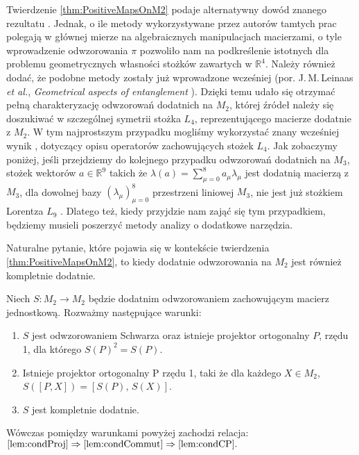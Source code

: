Twierdzenie \ref{thm:PositiveMapsOnM2} podaje alternatywny dowód
znanego rezultatu \cite{stormer1963positive, woronowicz1976positive}.
Jednak, o ile metody wykorzystywane przez autorów tamtych prac
polegają w głównej mierze na algebraicznych manipulacjach macierzami,
o tyle wprowadzenie odwzorowania $\pi$ pozwoliło nam
na podkreślenie istotnych dla problemu geometrycznych własności stożków
zawartych w  $\mathbb{R}^{4}$.
Należy również dodać, że podobne metody zostały już wprowadzone wcześniej
(por. J.\,M.\,Leinaas \emph{et al.}, \emph{Geometrical aspects of entanglement}
\cite{leinaas2006geometrical}).
Dzięki temu udało się otrzymać pełną charakteryzację odwzorowań dodatnich
na $M_{2}$,
której źródeł należy się doszukiwać w szczególnej symetrii stożka
$L_{4}$, reprezentującego macierze dodatnie z $M_{2}$.
W tym najprostszym przypadku mogliśmy wykorzystać znany wcześniej wynik
\cite{loewy1975positive}, dotyczący
opisu operatorów zachowujących stożek $L_{4}$.
Jak zobaczymy poniżej, jeśli przejdziemy do kolejnego przypadku
odwzorowań dodatnich na $M_{3}$,
stożek wektorów $a \in \mathbb{R}^{9}$ takich że
$\lambda(a) =  \sum_{\mu=0}^{8} a_{\mu} \lambda_{\mu}$
jest dodatnią macierzą z $M_{3}$,
dla dowolnej bazy $(\lambda_{\mu})_{\mu=0}^{8}$ przestrzeni liniowej $M_{3}$,
nie jest już stożkiem Lorentza $L_{9}$ \cite{goyal2011geometry}.
Dlatego też, kiedy przyjdzie nam zająć się tym przypadkiem,
będziemy musieli poszerzyć metody analizy o dodatkowe narzędzia.


Naturalne pytanie, które pojawia się w kontekście
twierdzenia \ref{thm:PositiveMapsOnM2},
to kiedy dodatnie odwzorowania na $M_{2}$ jest również kompletnie dodatnie.

\begin{Theorem}
\label{thm:MapsPreservingIdentity}
Niech $S: M_{2} \rightarrow M_{2}$ będzie dodatnim odwzorowaniem zachowującym
macierz jednostkową. Rozważmy następujące warunki:
\begin{enumerate}

\item
\label{lem:condProj}
$S$ jest odwzorowaniem Schwarza oraz istnieje projektor ortogonalny $P$, rzędu 1, dla którego $S(P)^{2} = S(P)$.

\item
\label{lem:condCommut}
Istnieje projektor ortogonalny P rzędu 1, taki że dla każdego $X \in M_{2}$,
$S([P,X]) = [S(P), \, S(X)]$.

\item
\label{lem:condCP}
$S$ jest kompletnie dodatnie.
\end{enumerate}
Wówczas pomiędzy warunkami powyżej zachodzi relacja:
$
\ref{lem:condProj} \Rightarrow
    \ref{lem:condCommut} \Rightarrow \ref{lem:condCP}.
$
\end{Theorem}

